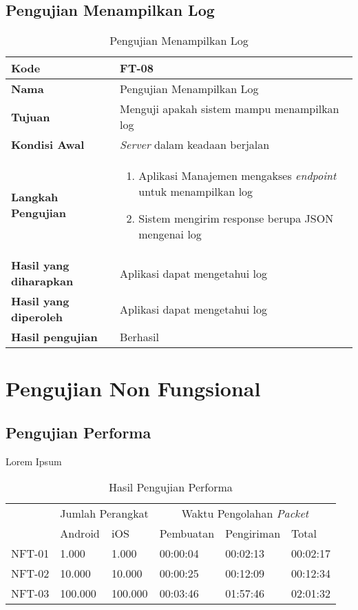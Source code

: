 \subsection{Pengujian Menampilkan Log}
\begin{longtable}{|p{2.5cm}|p{6.5cm}|}
	\caption{Pengujian Menampilkan Log} \label{t:uji_menampilkan_log} \\ \hline
	\textbf{Kode} & FT-08 \\ \hline
	\textbf{Nama} & Pengujian Menampilkan Log \\ \hline
	\textbf{Tujuan} & Menguji apakah sistem mampu menampilkan log \\ \hline
	\textbf{Kondisi Awal} &  \textit{Server} dalam keadaan berjalan\\ \hline
	\textbf{Langkah Pengujian} &  
	\begin{enumerate}
		\item Aplikasi Manajemen mengakses \textit{endpoint} untuk menampilkan log
		\item Sistem mengirim response berupa JSON mengenai log
	\end{enumerate} \\ \hline
	\textbf{Hasil yang diharapkan} & Aplikasi dapat mengetahui log \\ \hline
	\textbf{Hasil yang diperoleh} & Aplikasi dapat mengetahui log \\ \hline
	\textbf{Hasil pengujian} & Berhasil \\ \hline
\end{longtable}
\section{Pengujian Non Fungsional}

\subsection{Pengujian Performa}
\par Lorem Ipsum
\begin{longtable}{|p{1.3cm}|p{1.3cm}|p{1.3cm}|p{1.8cm}|p{1.8cm}|p{1.8cm}|}
	\caption{Hasil Pengujian Performa} \label{t:performa} \\ \hline
	\rowcolor{gray!10} & \multicolumn{2}{c|}{Jumlah Perangkat} & \multicolumn{3}{c|}{Waktu Pengolahan \textit{Packet}} \\ \hhline{~|*5{-}|}
	\rowcolor{gray!10} \multirow{-2}{*}{Kode} & Android & iOS & Pembuatan & Pengiriman & Total \\ \hline
	NFT-01 & 1.000 & 1.000 & 00:00:04 & 00:02:13 & 00:02:17 \\ \hline
	NFT-02 & 10.000 & 10.000 & 00:00:25 & 00:12:09 & 00:12:34 \\ \hline
	NFT-03 & 100.000 & 100.000 & 00:03:46 & 01:57:46 & 02:01:32 \\ \hline
\end{longtable}

